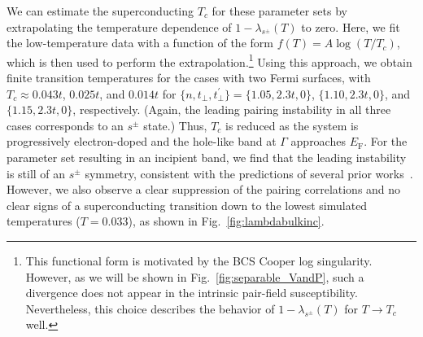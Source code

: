 \documentclass[prb,twocolumn,amsmath,amssymb,superscriptaddress,floatfix,nofootinbib]{revtex4-2}
\begin{document}
We can estimate the superconducting $T_c$ for these parameter sets by extrapolating the temperature dependence of $1-\lambda_{s^\pm}(T)$ to zero. Here, we fit the low-temperature data with a function of the form $f(T) = A\log(T/T_c)$, which is then used to perform the extrapolation.\footnote{This functional form is motivated by the BCS Cooper log singularity. However, as we will be shown in Fig.~\ref{fig:separable_VandP}, such a divergence does not appear in the intrinsic pair-field susceptibility. Nevertheless, this choice describes the behavior of $1-\lambda_{s^\pm}(T)$ for $T\rightarrow T_c$ well.} Using this approach, we obtain finite transition temperatures for the cases with two Fermi surfaces, with $T_c \approx 0.043t$, $0.025t$, and $0.014t$ for $\{n, t_\perp, t^\prime_\perp\} = \{1.05, 2.3t, 0\}$, $\{1.10, 2.3t, 0\}$, and $\{1.15, 2.3t, 0\}$, respectively. (Again, the leading pairing instability in all three cases corresponds to an $s^\pm$ state.) Thus, $T_c$ is reduced as the system is progressively electron-doped and the hole-like band at $\Gamma$ approaches $E_\mathrm{F}$. For the parameter set resulting in an incipient band, we find that the leading instability is still of an $s^\pm$ symmetry, consistent with the predictions of several prior works~\cite{BangNJP2014, LinscheidPRL2016, Mishra2016, KurokiFlex2020, Maier2019, RademakerEnhanced2021}. However, we also observe a clear suppression of the pairing correlations and no clear signs of a superconducting transition down to the lowest simulated temperatures ($T = 0.033$), as shown in Fig.~\ref{fig:lambdabulkinc}. 
\end{document}
